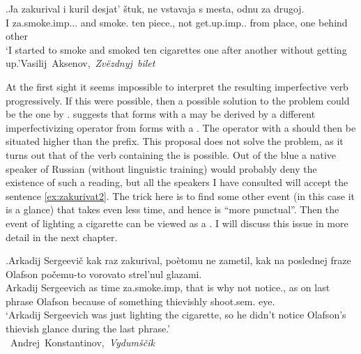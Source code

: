 \exg.\label{ex:zakurivat1}Ja zakurival i kuril desjat' \v{s}tuk, ne vstavaja s mesta, odnu za drugoj.\\
I za.smoke.imp... and smoke. ten piece., not get.up.imp.. from place, one behind other\\
\trans `I started to smoke and smoked ten cigarettes one after another without getting up.'\hbox{}\hfill\hbox{Vasilij Aksenov, \textit{Zv\"{e}zdnyj bilet}}

At the first sight it seems impossible to interpret the resulting imperfective verb progressively. If this were possible, then a possible solution to the problem could be the one by \citet{Ramchand:04}. \citeauthor{Ramchand:04} suggests that  forms with a  may be derived by a different imperfectivizing operator from  forms with a . The operator with a  should then be situated higher than the  prefix. This proposal does not solve the problem, as it turns out that  of the  verb containing the   is possible. Out of the blue a native speaker of Russian (without linguistic training) would probably deny the existence of such a reading, but all the speakers I have consulted will accept the sentence \ref{ex:zakurivat2}. The trick here is to find some other event (in this case it is a glance) that takes even less time, and hence is ``more punctual''. Then the event of lighting a cigarette can be viewed as a . I will discuss this issue in more detail in the next chapter.

\exg.\label{ex:zakurivat2}Arkadij Sergeevi\v{c} kak raz zakurival, po\`{e}tomu ne zametil, kak na poslednej fraze Olafson po\v{c}emu-to vorovato strel'nul glazami.\\
Arkadij Sergeevich as time za.smoke.imp, {that is why} not notice., as on last phrase Olafson {because of something} thievishly shoot.sem. eye.\\
\trans `Arkadij Sergeevich was just lighting the cigarette, so he didn't notice Olafson's thievish glance during the last phrase.'\\\hbox{}\hfill\hbox{
Andrej Konstantinov, \textit{Vydum\v{s}\v{c}ik}}

